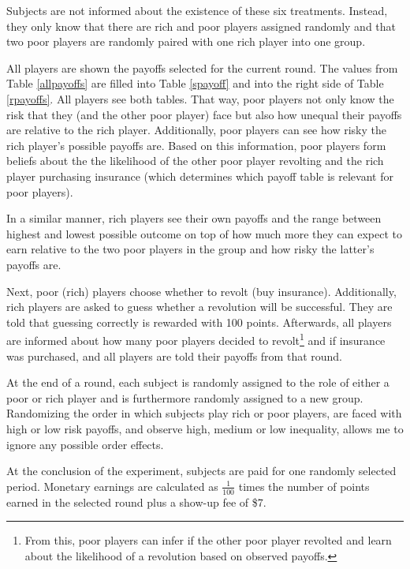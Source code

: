 \documentclass[12pt]{article}
\begin{document}
	Subjects are not informed about the existence of these six treatments. 
	Instead, they only know that there are rich and poor players assigned 
	randomly and that two poor players are randomly paired with one rich player 
	into one group.
	
	All players are shown the payoffs selected for the current round. 
	The values from Table \ref{allpayoffs} are filled into Table \ref{spayoff} 
	and into the right side of Table \ref{rpayoffs}. All players see both 
	tables. That way, poor players not only know the risk that they (and the 
	other poor player) face but also how unequal their payoffs are relative to 
	the rich player. Additionally, poor players can see how risky the rich 
	player's possible payoffs are. Based on this information, poor players form 
	beliefs about the the likelihood of the other poor player revolting and the 
	rich player purchasing insurance (which determines which payoff table is 
	relevant for poor players). 
	
	In a similar manner, rich players see their own payoffs and the range 
	between highest and lowest possible outcome on top of how much more they 
	can expect to earn relative to the two poor players in the group and how 
	risky the latter's payoffs are.
	
	Next, poor (rich) players choose whether to revolt (buy insurance). 
	Additionally, rich players are asked to guess whether a revolution will be 
	successful. They are told that guessing correctly is rewarded with 100 
	points.
	Afterwards, all players are informed about how many poor players decided to 
	revolt\footnote{From this, poor players can infer if the other poor player 
	revolted and learn about the likelihood of a revolution based on observed 
	payoffs.} and if insurance was purchased, and all players are told their 
	payoffs from that round.
	
	At the end of a round, each subject is randomly assigned to the role of 
	either a poor or rich player and is furthermore randomly assigned to a new 
	group. Randomizing the order in which subjects play rich or poor players, 
	are faced with high or low risk payoffs, and observe high, medium or low 
	inequality, allows me to ignore any possible order effects.
	
	At the conclusion of the experiment, subjects are paid for one randomly 
	selected period. Monetary earnings are calculated as $\frac{1}{100}$ 
	times the number of points earned in the selected round plus a show-up fee 
	of \$7.
	
\end{document}
